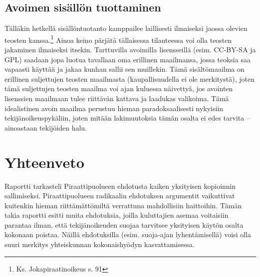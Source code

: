 \documentclass[titlepage,12pt]{article}
\begin{document}
\subsection{Avoimen sisällön tuottaminen}

Tälläkin hetkellä sisällöntuotanto kamppailee laillisesti ilmaiseksi
jaossa olevien teosten kanssa.\footnote{Ks. Jokapiraatinoikeus s. 91}
Ainoa keino pärjätä tällaisessa tilanteessa voi olla teosten jakaminen
ilmaiseksi itsekin.  Tarttuvilla avoimilla lisensseillä
(esim. CC-BY-SA ja GPL) saadaan jopa luotua tavallaan oma erillinen
maailmansa, jossa teoksia saa vapaasti käyttää ja jakaa kunhan sallii
sen muillekin.  Tämä sisältömaailma on erillinen suljettujen teosten
maailmasta (kaupallisuudella ei ole merkitystä), joten tämä
suljettujen teosten maailma voi ajan kuluessa näivettyä, jos avointen
lisenssien maailmaan tulee riittävän kattava ja laadukas valikoima.
Tämä idealistinen avoin maailma perustuu hieman paradoksaalisesti
nykyisiin tekijänoikeuspykäliin, joten mitään lakimuutoksia tämän
osalta ei edes tarvita -- ainoastaan tekijöiden halu.





\section{Yhteenveto}

Raportti tarkasteli Piraattipuolueen ehdotusta kaiken yksityisen
kopioinnin sallimiseksi.  Piraattipuolueen radikaalin ehdotuksen
argumentit vaikuttivat kuitenkin hieman riittämättömiltä verrattuna
mahdollisiin haittoihin.  Tämän takia raportti esitti muita
ehdotuksia, joilla kuluttajien asemaa voitaisiin parantaa ilman, että
tekijänoikeuden suojaa tarvitsee yksityisen käytön osalta kokonaan
poistaa.  Näillä ehdotuksilla (esim. suoja-ajan lyhentämisellä) voisi
olla suuri merkitys yhteiskunnan kokonaishyödyn kasvattamisessa.



\pagebreak


  

    
\end{document}
